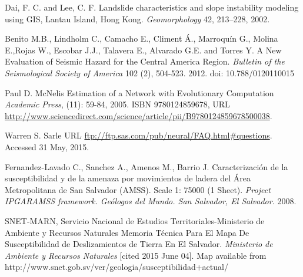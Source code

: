 \documentclass[11pt,twoside]{rmta2010esp}%
\begin{document}
\begin{thebibliography}{99}
Dai, F. C. and Lee, C. F.
\newblock Landslide characteristics and slope instability modeling using GIS, Lantau Island, Hong Kong.
\newblock \emph{Geomorphology}
 42, 213–228, 2002.



Benito M.B., Lindholm C., Camacho E., Climent Á., Marroquín G., Molina E.,Rojas W., Escobar J.J., Talavera E., Alvarado G.E. and Torres Y.
\newblock A New Evaluation of Seismic Hazard for the Central America Region. 
\newblock \emph{Bulletin of the Seismological Society of America}
 102 (2), 504-523. 2012.
\newblock  doi: 10.788/0120110015









Paul D. McNelis
\newblock Estimation of a Network with Evolutionary Computation
\newblock \emph{Academic Press},
  (11): 59-84, 2005.
\newblock ISBN 9780124859678,
\newblock URL
  \url{http://www.sciencedirect.com/science/article/pii/B9780124859678500038}.



Warren S. Sarle
\newblock URL
  \url{ftp://ftp.sas.com/pub/neural/FAQ.html#questions}.
  \newblock Accessed 31 May, 2015.




Fernandez-Lavado C., Sanchez A., Amenos M., Barrio J.
\newblock Caracterización de la susceptibilidad y de la amenaza por movimientos de ladera del Área Metropolitana de San Salvador (AMSS). Scale 1: 75000 (1 Sheet).
\newblock \emph{Project IPGARAMSS framework. Geólogos del Mundo. San Salvador, El Salvador.}
 2008.




SNET-MARN, Servicio Nacional de Estudios Territoriales-Ministerio de Ambiente y Recursos Naturales
\newblock Memoria Técnica Para El Mapa De Susceptibilidad de Deslizamientos de Tierra En El Salvador.
\newblock \emph{Ministerio de Ambiente y Recursos Naturales}
 [cited 2015 June 04]. Map available from http://www.snet.gob.sv/ver/geologia/susceptibilidad+actual/



\end{thebibliography}
\end{document}
